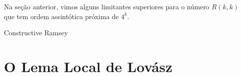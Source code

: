 Na seção anterior, vimos alguns limitantes superiores para o número $R(k,k)$ que tem ordem assintótica próxima de $4^k$.

\begin{openproblem}
Constructive Ramsey
\end{openproblem}


\section{O Lema Local de Lovász}

